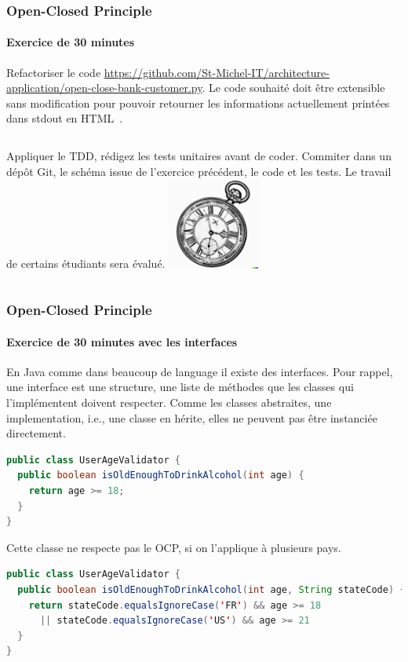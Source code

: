 \documentclass{beamer}
\begin{document}
    \begin{frame}
        \transdissolve
        \frametitle{Open-Closed Principle}
        \framesubtitle{Exercice \execcounterdispinc{} de 30 minutes}
        Refactoriser le code \url{https://github.com/St-Michel-IT/architecture-application/open-close-bank-customer.py}.
        Le code souhaité doit être extensible sans modification pour pouvoir retourner les informations actuellement printées dans stdout en HTML~.
        \begin{columns}
            Appliquer le TDD, rédigez les tests unitaires avant de coder.
            \bigbreak
            Commiter dans un dépôt Git, le schéma issue de l'exercice précédent, le code et les tests.
            \bigbreak
            Le travail de certains étudiants sera évalué.
            \centering
            \includegraphics[width=3cm]{image/engraving-of-an-old-watch}
        \end{columns}
    \end{frame}

    \begin{frame}[fragile]
        \transdissolve
        \frametitle{Open-Closed Principle}
        \framesubtitle{Exercice \execcounterdispinc{} de 30 minutes avec les interfaces}
        En Java comme dans beaucoup de language il existe des interfaces.
        Pour rappel, une interface est une structure, une liste de méthodes que les classes qui l'implémentent doivent respecter.
        Comme les classes abstraites, une implementation, i.e., une classe en hérite, elles ne peuvent pas être instanciée directement.
        \begin{lstlisting}[language=java]
public class UserAgeValidator {
  public boolean isOldEnoughToDrinkAlcohol(int age) {
    return age >= 18;
  }
}
        \end{lstlisting}
        Cette classe ne respecte pas le OCP, si on l'applique à plusieurs pays.
        \begin{lstlisting}[language=java]
public class UserAgeValidator {
  public boolean isOldEnoughToDrinkAlcohol(int age, String stateCode) {
    return stateCode.equalsIgnoreCase('FR') && age >= 18
      || stateCode.equalsIgnoreCase('US') && age >= 21
  }
}
        \end{lstlisting}
    \end{frame}
\end{document}
